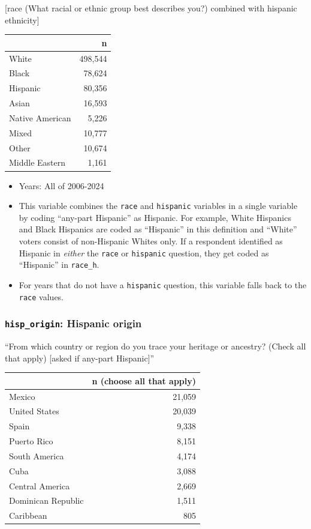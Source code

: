 \documentclass[10pt,article,oneside]{memoir}
\begin{document}
{[}race (What racial or ethnic group best describes you?) combined with
hispanic ethnicity{]}

\begin{table}[H]
\centering
\begin{tabular}[t]{lr}
\toprule
 & n\\
\midrule
White & 498,544\\
Black & 78,624\\
Hispanic & 80,356\\
Asian & 16,593\\
Native American & 5,226\\
Mixed & 10,777\\
Other & 10,674\\
Middle Eastern & 1,161\\
\bottomrule
\end{tabular}
\end{table}

\begin{itemize}
\tightlist
\item
  Years: All of 2006-2024
\item
  This variable combines the \texttt{race} and \texttt{hispanic}
  variables in a single variable by coding ``any-part Hispanic'' as
  Hispanic. For example, White Hispanics and Black Hispanics are coded
  as ``Hispanic'' in this definition and ``White'' voters consist of
  non-Hispanic Whites only. If a respondent identified as Hispanic in
  \emph{either} the \texttt{race} or \texttt{hispanic} question, they
  get coded as ``Hispanic'' in \texttt{race\_h}.
\item
  For years that do not have a \texttt{hispanic} question, this variable
  falls back to the \texttt{race} values.
\end{itemize}

\subsubsection{\texorpdfstring{\texttt{hisp\_origin}: Hispanic
origin}{hisp\_origin: Hispanic origin}}\label{hisp_origin-hispanic-origin}

``From which country or region do you trace your heritage or ancestry?
(Check all that apply) {[}asked if any-part Hispanic{]}''

\begin{table}[H]
\centering
\begin{tabular}[t]{lr}
\toprule
 & n (choose all that apply)\\
\midrule
Mexico & 21,059\\
United States & 20,039\\
Spain & 9,338\\
Puerto Rico & 8,151\\
South America & 4,174\\
Cuba & 3,088\\
Central America & 2,669\\
Dominican Republic & 1,511\\
Caribbean & 805\\
\bottomrule
\end{tabular}
\end{table}
\end{document}
